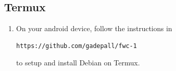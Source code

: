 \subsection{Termux}
\begin{enumerate}[label=\arabic*.,ref=\theenumi]
	\item On your android device, follow the instructions in 
%
\begin{lstlisting}
https://github.com/gadepall/fwc-1
\end{lstlisting}
to setup and install Debian on Termux.

\end{enumerate}
